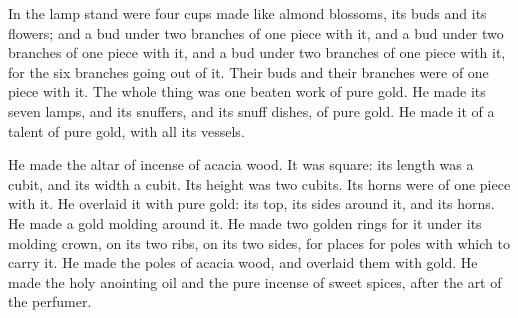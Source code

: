 {In the lamp stand were four cups made like almond blossoms, its buds and its flowers;
and a bud under two branches of one piece with it, and a bud under two branches of one piece with it, and a bud under two branches of one piece with it, for the six branches going out of it.
Their buds and their branches were of one piece with it. The whole thing was one beaten work of pure gold.
He made its seven lamps, and its snuffers, and its snuff dishes, of pure gold.
He made it of a talent of pure gold, with all its vessels.
\par }{\PP {}He made the altar of incense of acacia wood. It was square: its length was a cubit, and its width a cubit. Its height was two cubits. Its horns were of one piece with it.
He overlaid it with pure gold: its top, its sides around it, and its horns. He made a gold molding around it.
He made two golden rings for it under its molding crown, on its two ribs, on its two sides, for places for poles with which to carry it.
He made the poles of acacia wood, and overlaid them with gold.
He made the holy anointing oil and the pure incense of sweet spices, after the art of the perfumer.

}
